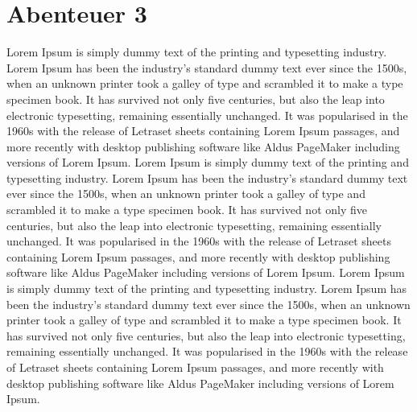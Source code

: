 \documentclass[11pt]{article}
\begin{document}
\section{Abenteuer 3}
\label{sec:org8ce1ddd}
Lorem Ipsum is simply dummy text of the printing and typesetting
industry. Lorem Ipsum has been the industry's standard dummy text ever
since the 1500s, when an unknown printer took a galley of type and
scrambled it to make a type specimen book. It has survived not only
five centuries, but also the leap into electronic typesetting,
remaining essentially unchanged. It was popularised in the 1960s with
the release of Letraset sheets containing Lorem Ipsum passages, and
more recently with desktop publishing software like Aldus PageMaker
including versions of Lorem Ipsum. 
Lorem Ipsum is simply dummy text of the printing and typesetting
industry. Lorem Ipsum has been the industry's standard dummy text ever
since the 1500s, when an unknown printer took a galley of type and
scrambled it to make a type specimen book. It has survived not only
five centuries, but also the leap into electronic typesetting,
remaining essentially unchanged. It was popularised in the 1960s with
the release of Letraset sheets containing Lorem Ipsum passages, and
more recently with desktop publishing software like Aldus PageMaker
including versions of Lorem Ipsum. Lorem Ipsum is simply dummy text of
the printing and typesetting industry. Lorem Ipsum has been the
industry's standard dummy text ever since the 1500s, when an unknown
printer took a galley of type and scrambled it to make a type specimen
book. It has survived not only five centuries, but also the leap into
electronic typesetting, remaining essentially unchanged. It was
popularised in the 1960s with the release of Letraset sheets
containing Lorem Ipsum passages, and more recently with desktop
publishing software like Aldus PageMaker including versions of Lorem
Ipsum. 
\end{document}
